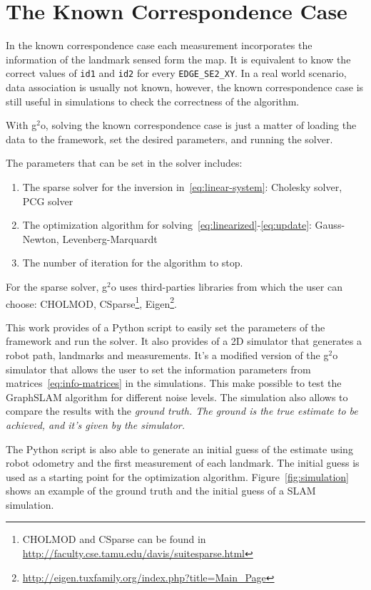 \section{The Known Correspondence Case}
\label{sec:known-asso-imp}

In the known correspondence case each measurement incorporates the information of the landmark sensed form the map. It is equivalent to know the correct values of \texttt{id1} and \texttt{id2} for every \texttt{EDGE\_SE2\_XY}. In a real world scenario, data association is usually not known, however, the known correspondence case is still useful in simulations to check the correctness of the algorithm.

With g$^2$o, solving the known correspondence case is just a matter of loading the data to the framework, set the desired parameters, and running the solver. 

The parameters that can be set in the solver includes: 

\begin{enumerate}
    \item The sparse solver for the inversion in~\eqref{eq:linear-system}: Cholesky solver, PCG solver
    \item The optimization algorithm for solving~\eqref{eq:linearized}-\eqref{eq:update}: Gauss-Newton, Levenberg-Marquardt
    \item The number of iteration for the algorithm to stop.
\end{enumerate}

For the sparse solver, g$^2$o uses third-parties libraries from which the user can choose: CHOLMOD, CSparse\footnote{CHOLMOD and CSparse can be found in \url{http://faculty.cse.tamu.edu/davis/suitesparse.html}}, Eigen\footnote{\url{http://eigen.tuxfamily.org/index.php?title=Main_Page}}. 

This work provides of a Python script to easily set the parameters of the framework and run the solver. It also provides of a 2D simulator that generates a robot path, landmarks and measurements. It's a modified version of the g$^2$o simulator that allows the user to set the information parameters from matrices~\eqref{eq:info-matrices} in the simulations. This make possible to test the GraphSLAM algorithm for different noise levels. The simulation also allows to compare the results with the \it{ground truth}. The ground is the true estimate to be achieved, and it's given by the simulator. 

The Python script is also able to generate an initial guess of the estimate using robot odometry and the first measurement of each landmark. The initial guess is used as a starting point for the optimization algorithm. Figure~\ref{fig:simulation} shows an example of the ground truth and the initial guess of a SLAM simulation.

